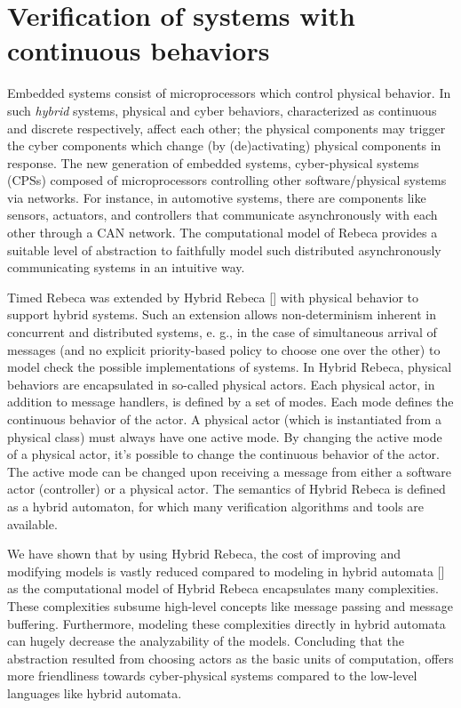 \section{Verification of systems with continuous behaviors}\label{sec::HRebeca}
Embedded systems consist of microprocessors which control physical behavior. In such \emph{hybrid} systems, physical and cyber behaviors, characterized as continuous and discrete respectively, affect each other; the physical components may trigger the cyber components which change (by (de)activating) physical components in response. The new generation of embedded systems, cyber-physical systems (CPSs) composed of microprocessors controlling other software/physical systems via networks. For instance, in automotive systems, there are components like sensors, actuators, and controllers that communicate asynchronously with each other through a CAN network. The computational model of Rebeca provides a suitable level of abstraction to faithfully model such distributed asynchronously communicating systems in an intuitive way.

Timed Rebeca was extended by Hybrid Rebeca [] with physical behavior to support hybrid systems. Such an extension allows non-determinism inherent in concurrent and distributed systems, e. g., in the case of simultaneous arrival of messages (and no explicit priority-based policy to choose one over the other) to model check the possible implementations of systems. In Hybrid Rebeca, physical behaviors are encapsulated in so-called physical actors. Each physical actor, in addition to message handlers, is defined by a set of modes. Each mode defines the continuous behavior of the actor. A physical actor (which is instantiated from a physical class) must always have one active mode. By changing the active mode of a physical actor, it's possible to change the continuous behavior of the actor. The active mode can be changed upon receiving a message from either a software actor (controller) or a physical actor. The semantics of Hybrid Rebeca is defined as a hybrid automaton, for which many verification algorithms and tools are available. 

We have shown that by using Hybrid Rebeca, the cost of improving and modifying models is vastly reduced compared to modeling in hybrid automata [] as the computational model of Hybrid Rebeca encapsulates many complexities. These complexities subsume high-level concepts like message passing and message buffering. Furthermore, modeling these complexities directly in hybrid automata can hugely decrease the analyzability of the models. Concluding that the abstraction resulted from choosing actors as the basic units of computation, offers more friendliness towards cyber-physical systems compared to the low-level languages like hybrid automata.